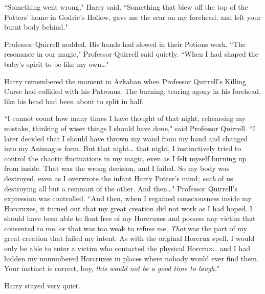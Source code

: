 ``Something went wrong," Harry said. ``Something that blew off the top of the Potters' home in Godric's Hollow, gave me the scar on my forehead, and left your burnt body behind."

Professor Quirrell nodded. His hands had slowed in their Potions work. ``The resonance in our magic," Professor Quirrell said quietly. ``When I had shaped the baby's spirit to be like my own{\ldots}"

Harry remembered the moment in Azkaban when Professor Quirrell's Killing Curse had collided with his Patronus. The burning, tearing agony in his forehead, like his head had been about to split in half.

``I cannot count how many times I have thought of that night, rehearsing my mistake, thinking of wiser things I should have done," said Professor Quirrell. ``I later decided that I should have thrown my wand from my hand and changed into my Animagus form. But that night{\ldots} that night, I instinctively tried to control the chaotic fluctuations in my magic, even as I felt myself burning up from inside. That was the wrong decision, and I failed. So my body was destroyed, even as I overwrote the infant Harry Potter's mind; \emph{each} of us destroying all but a remnant of the other. And then{\ldots}" Professor Quirrell's expression was controlled. ``And then, when I regained consciousness inside my Horcruxes, it turned out that my great creation did not work as I had hoped. I should have been able to float free of my Horcruxes and possess any victim that consented to me, or that was too weak to refuse me. \emph{That} was the part of my great creation that failed my intent. As with the original Horcrux spell, I would only be able to enter a victim who contacted the physical Horcrux{\ldots} and I had hidden my unnumbered Horcruxes in places where nobody would ever find them. Your instinct is correct, boy, \emph{this would not be a good time to laugh.}"

Harry stayed very quiet.

